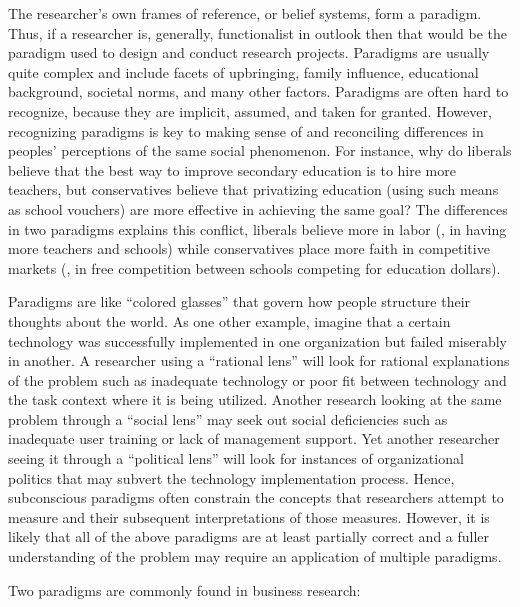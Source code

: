 The researcher's own frames of reference, or belief systems, form a paradigm. Thus, if a researcher is, generally, functionalist in outlook then that would be the paradigm used to design and conduct research projects. Paradigms are usually quite complex and include facets of upbringing, family influence, educational background, societal norms, and many other factors. Paradigms are often hard to recognize, because they are implicit, assumed, and taken for granted. However, recognizing paradigms is key to making sense of and reconciling differences in peoples' perceptions of the same social phenomenon. For instance, why do liberals believe that the best way to improve secondary education is to hire more teachers, but conservatives believe that privatizing education (using such means as school vouchers) are more effective in achieving the same goal? The differences in two paradigms explains this conflict, liberals believe more in labor (\ie, in having more teachers and schools) while conservatives place more faith in competitive markets (\ie, in free competition between schools competing for education dollars). 

Paradigms are like ``colored glasses'' that govern how people structure their thoughts about the world. As one other example, imagine that a certain technology was successfully implemented in one organization but failed miserably in another. A researcher using a ``rational lens'' will look for rational explanations of the problem such as inadequate technology or poor fit between technology and the task context where it is being utilized. Another research looking at the same problem through a ``social lens'' may seek out social deficiencies such as inadequate user training or lack of management support. Yet another researcher seeing it through a ``political lens'' will look for instances of organizational politics that may subvert the technology implementation process. Hence, subconscious paradigms often constrain the concepts that researchers attempt to measure and their subsequent interpretations of those measures. However, it is likely that all of the above paradigms are at least partially correct and a fuller understanding of the problem may require an application of multiple paradigms.

Two paradigms are commonly found in business research:


